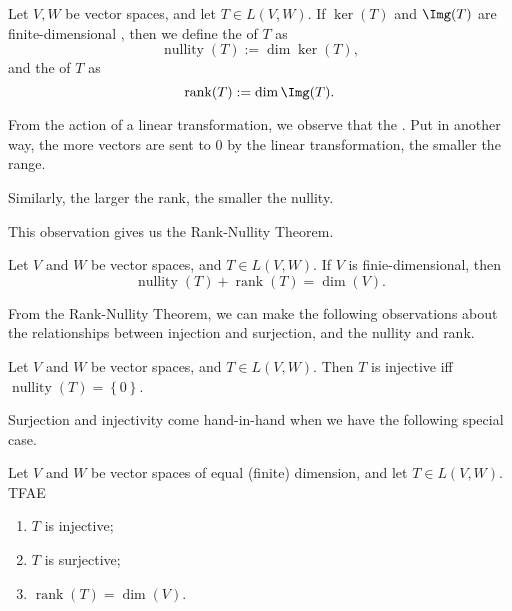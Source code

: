 \documentclass[notoc,notitlepage]{tufte-book}
\DeclareMathOperator{\nullity}{nullity}
\DeclareMathOperator{\rank}{rank}
\begin{document}
\begin{defn}\label{defn:rank_and_nullity}
  Let $V, W$ be vector spaces, and let $T \in L(V, W)$.
  If $\ker(T)$ and $\Img(T)$ are finite-dimensional
  ,
  then we define the  of $T$ as
  \begin{equation*}
    \nullity(T) := \dim \ker (T),
  \end{equation*}
  and the  of $T$ as
  \begin{equation*}
    \rank(T) := \dim \Img(T).
  \end{equation*}
\end{defn}

\begin{note}
  From the action of a linear transformation,
  we observe that the .
  Put in another way, the more vectors are sent to $0$ by the linear transformation,
  the smaller the range.

  Similarly, the larger the rank, the smaller the nullity.
\end{note}

This observation gives us the Rank-Nullity Theorem.

\begin{thm}\label{thm:rank_nullity_theorem}
  Let $V$ and $W$ be vector spaces, and $T \in L(V, W)$. If $V$ is finie-dimensional, then
  \begin{equation*}
    \nullity(T) + \rank(T) = \dim (V).
  \end{equation*}
\end{thm}

From the Rank-Nullity Theorem,
we can make the following observations about the relationships
between injection and surjection, and the nullity and rank.

\begin{propo}\label{propo:nullity_of_only_0_and_injectivity}
  Let $V$ and $W$ be vector spaces, and $T \in L(V, W)$.
  Then $T$ is injective iff $\nullity(T) = \left\{ 0 \right\}$.
\end{propo}

Surjection and injectivity come hand-in-hand when
we have the following special case.

\begin{propo}\label{propo:when_rank_equals_the_dimension_of_the_space}
  Let $V$ and $W$ be vector spaces of equal (finite) dimension,
  and let $T \in L(V, W)$. TFAE
  \begin{enumerate}
    \item $T$ is injective;
    \item $T$ is surjective;
    \item $\rank(T) = \dim(V)$.
  \end{enumerate}
\end{propo}
\end{document}
